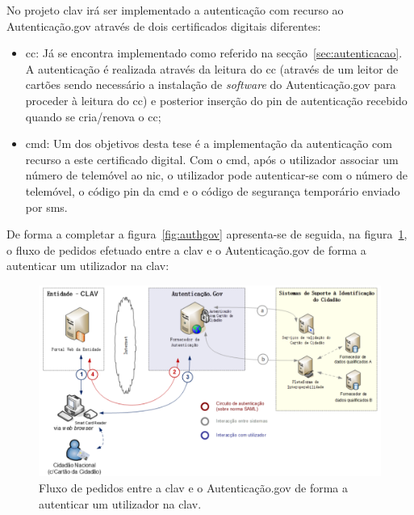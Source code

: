 No projeto \acrshort{clav} irá ser implementado a autenticação com recurso ao Autenticação.gov através de dois 
certificados digitais diferentes:
\begin{itemize}
    \item \acrfull{cc}: Já se encontra implementado como referido na secção~\ref{sec:autenticacao}. 
    A autenticação é realizada através da leitura do \acrshort{cc} (através de um leitor de cartões sendo 
    necessário a instalação de \textit{software} do Autenticação.gov para proceder à leitura do \acrshort{cc}) e 
    posterior inserção do \acrshort{pin} de autenticação recebido quando se cria/renova o \acrshort{cc};

    \item \acrfull{cmd}: Um dos objetivos desta tese é a implementação da autenticação com recurso a este 
    certificado digital. Com o \acrshort{cmd}, após o utilizador associar um número de telemóvel ao 
    \acrshort{nic}, o utilizador pode autenticar-se com o número de telemóvel, o código \acrshort{pin} da 
    \acrshort{cmd} e o código de segurança temporário enviado por \acrshort{sms}.
\end{itemize}

De forma a completar a figura~\ref{fig:authgov} apresenta-se de seguida, na figura~\ref{fig:fluxoauthgov}, o fluxo de pedidos efetuado entre 
a \acrshort{clav} e o Autenticação.gov de forma a autenticar um utilizador na \acrshort{clav}:~\cite{agov}
\begin{figure}[H]
    \centering
    \includegraphics[width=1\textwidth]{img/fluxoauthgov.png}
    \caption{Fluxo de pedidos entre a \acrshort{clav} e o Autenticação.gov de forma a autenticar um utilizador na \acrshort{clav}.~\cite{agov}}\label{fig:fluxoauthgov}
\end{figure}

